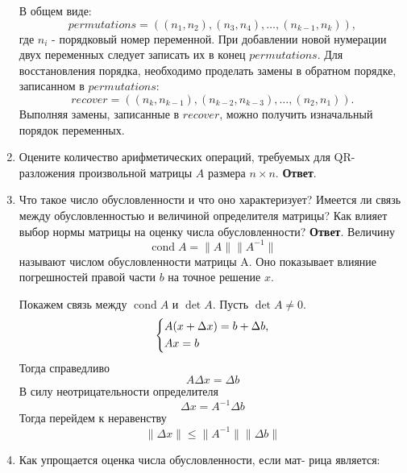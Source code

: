 \documentclass{article}
\newcommand{\cond}{\mathop{\mathrm{cond}}\nolimits}
\begin{document}
\begin{enumerate}
    В общем виде:
    \begin{equation*}
        permutations = ((n_1, n_2), (n_3, n_4), \ldots, (n_{k-1}, n_k)),
    \end{equation*}
    где $n_i$ - порядковый номер переменной.
    При добавлении новой нумерации двух переменных следует записать их в конец $permutations$.
    Для восстановления порядка, необходимо проделать замены в обратном порядке, записанном в $permutations$:
    \begin{equation*}
        recover = ((n_k, n_{k-1}), (n_{k-2}, n_{k-3}), \ldots, (n_2, n_1)).
    \end{equation*}
    Выполняя замены, записанные в $recover$, можно получить изначальный порядок переменных.
    \item Оцените количество арифметических операций, требуемых для QR-разложения произвольной матрицы $A$ размера $n\times n $.
    \newline
    {\bfseries Ответ}.
    \item Что такое число обусловленности и что оно характеризует?
    Имеется ли связь между обусловленностью и величиной
    определителя матрицы? Как влияет выбор нормы матрицы
    на оценку числа обусловленности?
    \newline
    {\bfseries Ответ}.
    Величину
    \begin{equation*}
        \cond A = \|A\| \|A^{-1}\|
    \end{equation*}
    называют числом обусловленности матрицы A. Оно показывает влияние погрешностей
    правой части $b$ на точное решение $x$. 
    
    Покажем связь между $\cond A$ и $\det A$. Пусть $\det A \neq 0$.
    \begin{equation*}
        \begin{dcases}
            A(x+\Delta x) = b + \Delta b, \\
            Ax = b
        \end{dcases}
    \end{equation*}
    Тогда справедливо
    \begin{equation*}
        A\Delta x = \Delta b
    \end{equation*}
    В силу неотрицательности определителя
    \begin{equation*}
        \Delta x = A^{-1}\Delta b
    \end{equation*}
    Тогда перейдем к неравенству
    \begin{equation*}
        \|\Delta x\| \leqslant \|A^{-1}\| \|\Delta b\|
    \end{equation*}
    \item Как упрощается оценка числа обусловленности, если мат-
    рица является:
    

\end{enumerate}
\end{document}
